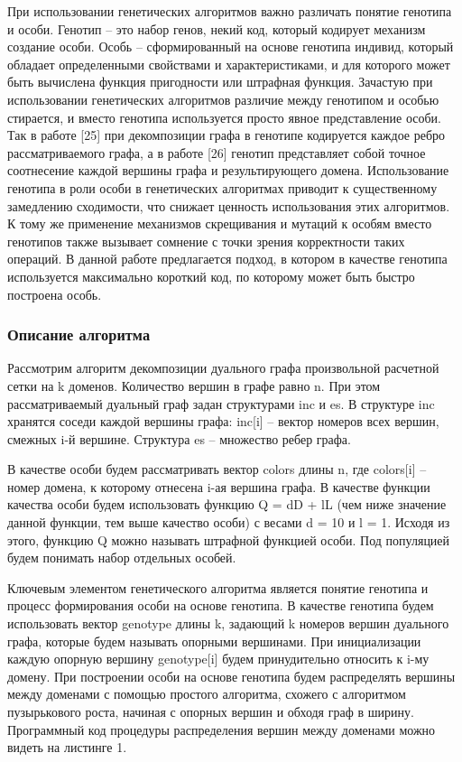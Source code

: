 При использовании генетических алгоритмов важно различать понятие генотипа и особи.
Генотип – это набор генов, некий код, который кодирует механизм создание особи.
Особь – сформированный на основе генотипа индивид, который обладает определенными свойствами и характеристиками, и для которого может быть вычислена функция пригодности или штрафная функция.
Зачастую при использовании генетических алгоритмов различие между генотипом и особью стирается, и вместо генотипа используется просто явное представление особи.
Так в работе [25] при декомпозиции графа в генотипе кодируется каждое ребро рассматриваемого графа, а в работе [26] генотип представляет собой точное соотнесение каждой вершины графа и результирующего домена.
Использование генотипа в роли особи в генетических алгоритмах приводит к существенному замедлению сходимости, что снижает ценность использования этих алгоритмов.
К тому же применение механизмов скрещивания и мутаций к особям вместо генотипов также вызывает сомнение с точки зрения корректности таких операций. В данной работе предлагается подход, в котором в качестве генотипа используется максимально короткий код, по которому может быть быстро построена особь.

\subsubsection{Описание алгоритма}

Рассмотрим алгоритм декомпозиции дуального графа произвольной расчетной сетки на k доменов.
Количество вершин в графе равно n. При этом рассматриваемый дуальный граф задан структурами inc и es. В структуре inc хранятся соседи каждой вершины графа: inc[i] – вектор номеров всех вершин, смежных i-й вершине.
Структура es – множество ребер графа.

В качестве особи будем рассматривать вектор colors длины n, где colors[i] – номер домена, к которому отнесена i-ая вершина графа.
В качестве функции качества особи будем использовать функцию Q = dD + lL (чем ниже значение данной функции, тем выше качество особи) с весами d = 10 и l = 1.
Исходя из этого, функцию Q можно называть штрафной функцией особи.
Под популяцией будем понимать набор отдельных особей.

Ключевым элементом генетического алгоритма является понятие генотипа и процесс формирования особи на основе генотипа.
В качестве генотипа будем использовать вектор genotype длины k, задающий k номеров вершин дуального графа, которые будем называть опорными вершинами.
При инициализации каждую опорную вершину genotype[i] будем принудительно относить к i-му домену.
При построении особи на основе генотипа будем распределять вершины между доменами с помощью простого алгоритма, схожего с алгоритмом пузырькового роста, начиная с опорных вершин и обходя граф в ширину.
Программный код процедуры распределения вершин между доменами можно видеть на листинге 1.


